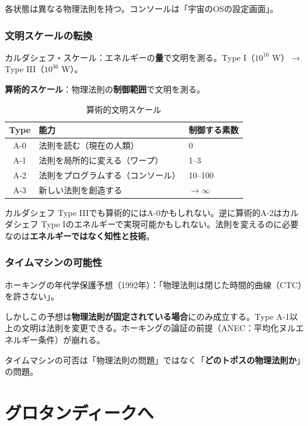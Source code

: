 \documentclass[12pt,a4paper]{article}
\begin{document}
各状態は異なる物理法則を持つ。コンソールは「宇宙のOSの設定画面」。

\section{文明スケールの転換}

カルダシェフ・スケール：エネルギーの\textbf{量}で文明を測る。Type I（$10^{16}$ W） → Type III（$10^{36}$ W）。

\textbf{算術的スケール}：物理法則の\textbf{制御範囲}で文明を測る。

\begin{table}[h]
\centering
\caption{算術的文明スケール}
\begin{tabular}{@{}cll@{}}
\toprule
Type & 能力 & 制御する素数 \\
\midrule
A-0 & 法則を読む（現在の人類） & 0 \\
A-1 & 法則を局所的に変える（ワープ） & 1--3 \\
A-2 & 法則をプログラムする（コンソール） & 10--100 \\
A-3 & 新しい法則を創造する & $\to \infty$ \\
\bottomrule
\end{tabular}
\end{table}

カルダシェフ Type IIIでも算術的にはA-0かもしれない。逆に算術的A-2はカルダシェフ Type Iのエネルギーで実現可能かもしれない。法則を変えるのに必要なのは\textbf{エネルギーではなく知性と技術}。

\section{タイムマシンの可能性}

ホーキングの年代学保護予想（1992年）：「物理法則は閉じた時間的曲線（CTC）を許さない」。

しかしこの予想は\textbf{物理法則が固定されている場合}にのみ成立する。Type A-1以上の文明は法則を変更できる。ホーキングの論証の前提（ANEC：平均化ヌルエネルギー条件）が崩れる。

タイムマシンの可否は「物理法則の問題」ではなく「\textbf{どのトポスの物理法則か}」の問題。

\part{グロタンディークへ}
\end{document}
